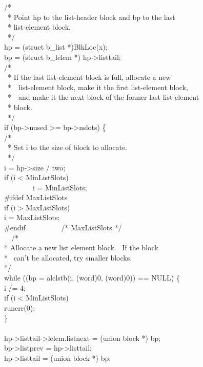 \begin{iconcode}
\>/*\\
\>\ * Point hp to the list-header block and bp to the last\\
\>\ * list-element block.\\
\>\ */\\
\>hp = (struct b\_list *)BlkLoc(x);\\
\>bp = (struct b\_lelem *) hp->listtail;\\
\>/*\\
\>\ * If the last list-element block is full, allocate a new\\
\>\ *\ \ list-element block, make it the first list-element block,\\
\>\ *\ \ and make it the next block of the former last list-element\\
\>\ * block.\\
\>\ */\\
\>if (bp->nused >= bp->nslots) \{\\
\>\>/*\\
\>\>\ * Set i to the size of block to allocate.\\
\>\>\ */\\
\>\>i = hp->size / two;\\
\>\>if (i < MinListSlots)\\\ \  \ \ \ \ \ \ i = MinListSlots;\\
\#ifdef MaxListSlots\\
\>\>if (i > MaxListSlots)\\
\>\>\>i = MaxListSlots;\\
\#endif\ \ \ \ \ \ \ \ \ \ /* MaxListSlots */\\
\>\ \ /*\\
\>\>* Allocate a new list element block. \ If the block\\
\>\>* \ can't be allocated, try smaller blocks.\\
\>\>*/\\
\>\>while ((bp = alclstb(i, (word)0, (word)0)) == NULL) \{\\
\>\>\>i /= 4;\\
\>\>\>if (i < MinListSlots)\\
\>\>\>\>runerr(0);\\
\>\>\}\\
\\
\>\>hp->listtail->lelem.listnext = (union block *) bp;\\
\>\>bp->listprev = hp->listtail;\\
\>\>hp->listtail = (union block *) bp;\\

\end{iconcode}
